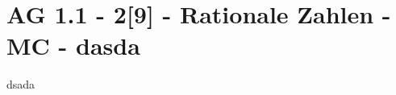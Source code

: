 \section{AG 1.1 - 2[9] - Rationale Zahlen - MC - dasda}

\begin{beispiel}[AG 1.1]{1}
dsada
\end{beispiel}